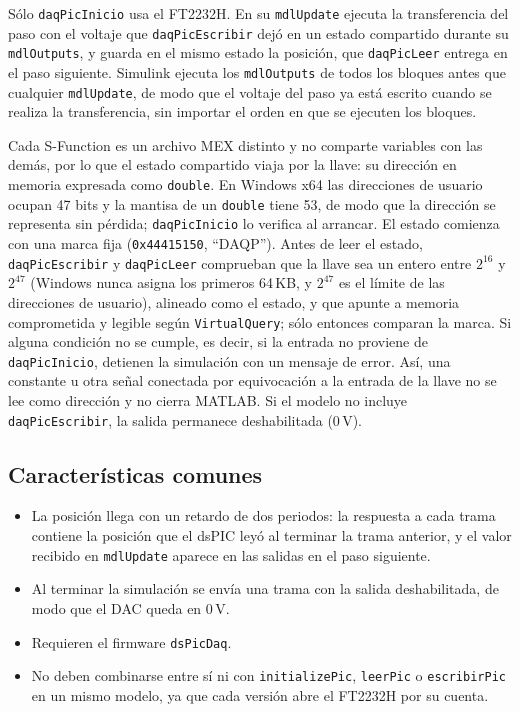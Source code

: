 \documentclass[11pt]{article}
\newcommand{\code}[1]{\texttt{#1}}
\begin{document}
Sólo \code{daqPicInicio} usa el FT2232H. En su \code{mdlUpdate} ejecuta la
transferencia del paso con el voltaje que \code{daqPicEscribir} dejó en un
estado compartido durante su \code{mdlOutputs}, y guarda en el mismo estado
la posición, que \code{daqPicLeer} entrega en el paso siguiente. Simulink
ejecuta los \code{mdlOutputs} de todos los bloques antes que cualquier
\code{mdlUpdate}, de modo que el voltaje del paso ya está escrito cuando se
realiza la transferencia, sin importar el orden en que se ejecuten los
bloques.

Cada S-Function es un archivo MEX distinto y no comparte variables con las
demás, por lo que el estado compartido viaja por la llave: su dirección en
memoria expresada como \code{double}. En Windows x64 las direcciones de
usuario ocupan 47 bits y la mantisa de un \code{double} tiene 53, de modo
que la dirección se representa sin pérdida; \code{daqPicInicio} lo verifica
al arrancar. El estado comienza con una marca fija (\code{0x44415150},
``DAQP''). Antes de leer el estado, \code{daqPicEscribir} y
\code{daqPicLeer} comprueban que la llave sea un entero entre $2^{16}$ y
$2^{47}$ (Windows nunca asigna los primeros 64\,KB, y $2^{47}$ es el límite
de las direcciones de usuario), alineado como el estado, y que apunte a
memoria comprometida y legible según \code{VirtualQuery}; sólo entonces
comparan la marca. Si alguna condición no se cumple, es decir, si la entrada
no proviene de \code{daqPicInicio}, detienen la simulación con un mensaje de
error. Así, una constante u otra señal conectada por equivocación a la
entrada de la llave no se lee como dirección y no cierra MATLAB. Si el modelo no incluye \code{daqPicEscribir}, la
salida permanece deshabilitada (0\,V).

\subsection{Características comunes}

\begin{itemize}
\item La posición llega con un retardo de dos periodos: la respuesta a cada
  trama contiene la posición que el dsPIC leyó al terminar la trama
  anterior, y el valor recibido en \code{mdlUpdate} aparece en las salidas
  en el paso siguiente.
\item Al terminar la simulación se envía una trama con la salida
  deshabilitada, de modo que el DAC queda en 0\,V.
\item Requieren el firmware \code{dsPicDaq}.
\item No deben combinarse entre sí ni con \code{initializePic},
  \code{leerPic} o \code{escribirPic} en un mismo modelo, ya que cada
  versión abre el FT2232H por su cuenta.
\end{itemize}
\end{document}
